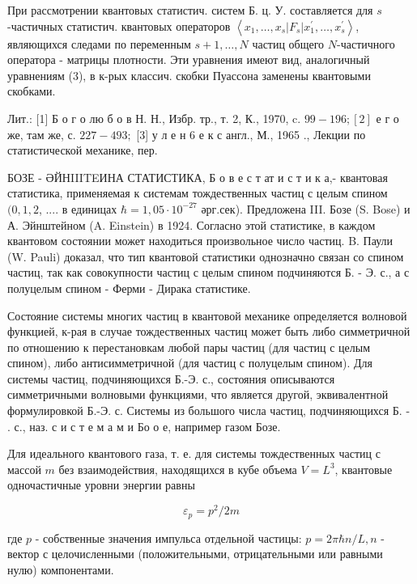 \documentclass[10pt]{article}
\begin{document}
При рассмотрении квантовых статистич. систем Б. ц. У. составляется для $s$-частичных статистич. квантовых операторов $\left\langle x_{1}, \ldots, x_{s}\left|F_{s}\right| x_{1}^{\prime}, \ldots, x_{s}^{\prime}\right\rangle$, являющихся следами по переменным $s+1, \ldots, N$ частиц общего $N$-частичного оператора - матрицы плотности. Эти уравнения имеют вид, аналогичный уравнениям (3), в к-рых классич. скобки Пуассона заменены квантовыми скобками.



Лит.: [1] Б о г о лю б о в Н. Н., Избр. тр., т. 2, К., 1970, c. $99-196 ;[2]$ е г о же, там же, с. $227-493 ;$ [3] у л е н 6 е к с англ., М., 1965 ., Лекции по статистической механике, пер.



БОЗЕ - ӘЙНIIITEИНА СТАТИСТИКА, Б $о$ в е с т ат и с т и к а,- квантовая статистика, применяемая к системам тождественных частиц с целым спином $(0,1,2$, .... в единицах $\hbar=1,05 \cdot 10^{-27}$ әрг.сек). Предложена III. Бозе (S. Bose) и А. Эйнштейном (A. Einstein) в 1924. Согласно этой статистике, в каждом квантовом состоянии может находиться произвольное число частиц. B. Паули (W. Pauli) доказал, что тип квантовой статистики однозначно связан со спином частиц, так как совокупности частиц с целым спином подчиняются Б. - Э. с., а с полуцелым спином - Ферми - Дирака статистике.



Состояние системы многих частиц в квантовой механике определяется волновой функцией, к-рая в случае тождественных частиц может быть либо симметричной по отношению к перестановкам любой пары частиц (для частиц с целым спином), либо антисимметричной (для частиц с полуцелым спином). Для системы частиц, подчиняющихся Б.-Э. с., состояния описываются симметричными волновыми функциями, что является другой, эквивалентной формулировкой Б.-Э. с. Системы из большого числа частиц, подчиняющихся Б. - . с., наз. с и с т е м а м и Бо о е, например газом Бозе.



Для идеального квантового газа, т. е. для системы тождественных частиц с массой $m$ без взаимодействия, находящихся в кубе объема $V=L^{3}$, квантовые одночастичные уровни энергии равны



\[

\varepsilon_{p}=p^{2} / 2 m

\]



где $p$ - собственные значения импульса отдельной частицы: $p=2 \pi \hbar n / L, n$ - вектор с целочисленными (положительными, отрицательными или равными нулю) компонентами.
\end{document}
